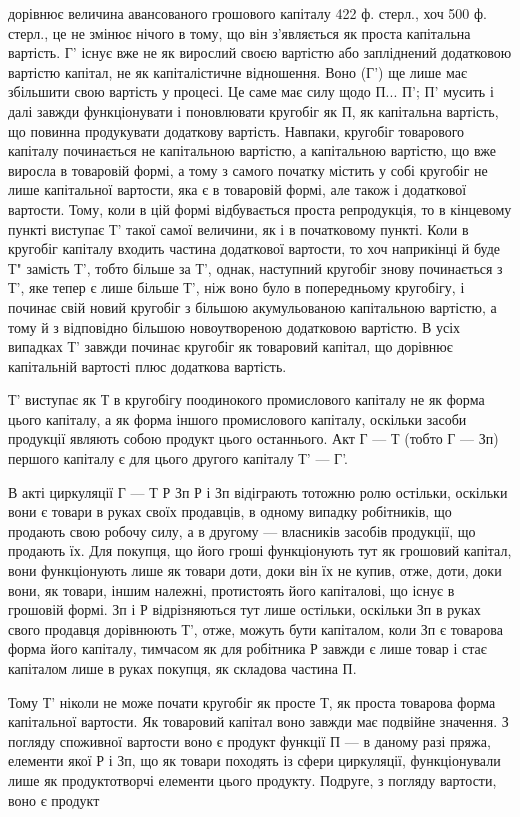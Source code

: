 дорівнює величина авансованого грошового капіталу 422 ф. стерл., хоч
500 ф. стерл., це не змінює нічого в тому, що він з’являється як проста
капітальна вартість. Г' існує вже не як вирослий своєю вартістю або
запліднений додатковою вартістю капітал, не як капіталістичне відношення.
Воно (Г') ще лише має збільшити свою вартість у процесі. Це саме має
силу щодо П... П'; П' мусить і далі завжди функціонувати і поновлювати
кругобіг як П, як капітальна вартість, що повинна продукувати додаткову
вартість. Навпаки, кругобіг товарового капіталу починається не
капітальною вартістю, а капітальною вартістю, що вже виросла в товаровій
формі, а тому з самого початку містить у собі кругобіг не лише капітальної
вартости, яка є в товаровій формі, але також і додаткової вартости.
Тому, коли в цій формі відбувається проста репродукція, то в кінцевому
пункті виступає Т' такої самої величини, як і в початковому пункті.
Коли в кругобіг капіталу входить частина додаткової вартости, то хоч
наприкінці й буде Т" замість Т', тобто більше за Т', однак, наступний кругобіг
знову починається з Т', яке тепер є лише більше Т', ніж воно
було в попередньому кругобігу, і починає свій новий кругобіг з більшою
акумульованою капітальною вартістю, а тому й з відповідно більшою
новоутвореною додатковою вартістю. В усіх випадках Т' завжди починає
кругобіг як товаровий капітал, що дорівнює капітальній вартості плюс
додаткова вартість.

Т' виступає як Т в кругобігу поодинокого промислового капіталу не
як форма цього капіталу, а як форма іншого промислового капіталу,
оскільки засоби продукції являють собою продукт цього останнього.
Акт Г — Т (тобто Г — Зп) першого капіталу є для цього другого капіталу
Т' — Г'.

В акті циркуляції Г — Т Р Зп Р і Зп відіграють тотожню ролю остільки,
оскільки вони є товари в руках своїх продавців, в одному випадку
робітників, що продають свою робочу силу, а в другому — власників
засобів продукції, що продають їх. Для покупця, що його гроші
функціонують тут як грошовий капітал, вони функціонують
лише як товари доти, доки він їх не купив, отже, доти, доки
вони, як товари, іншим належні, протистоять його капіталові, що
існує в грошовій формі. Зп і Р відрізняються тут лише остільки,
оскільки Зп в руках свого продавця дорівнюють Т', отже, можуть бути
капіталом, коли Зп є товарова форма його капіталу, тимчасом як для
робітника Р завжди є лише товар і стає капіталом лише в руках покупця,
як складова частина П.

Тому Т' ніколи не може почати кругобіг як просте Т, як проста
товарова форма капітальної вартости. Як товаровий капітал воно завжди
має подвійне значення. З погляду споживної вартости воно є продукт
функції П — в даному разі пряжа, елементи якої Р і Зп, що як товари
походять із сфери циркуляції, функціонували лише як продуктотворчі
елементи цього продукту. Подруге, з погляду вартости, воно є продукт
